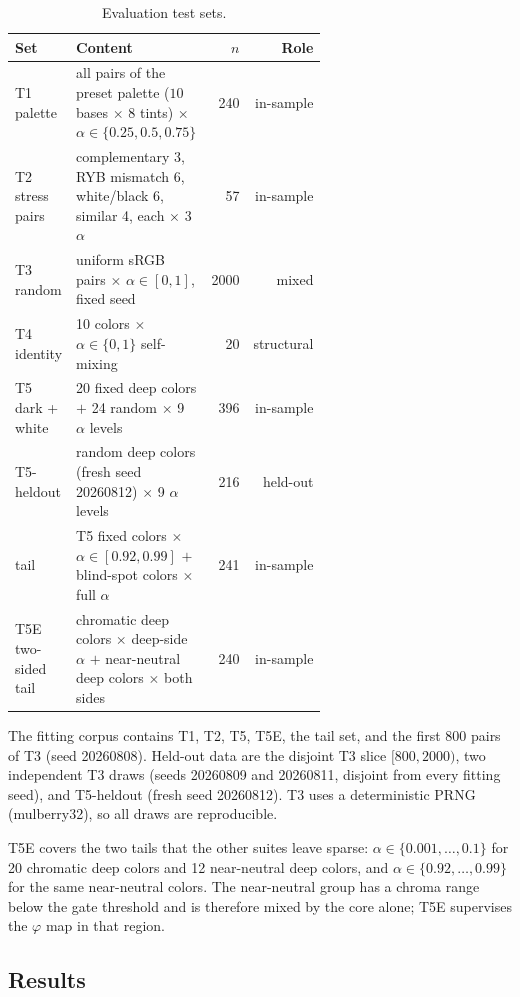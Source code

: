 \begin{table}[t]
\centering
\footnotesize
\setlength{\tabcolsep}{3pt}
\caption{Evaluation test sets.}
\label{tab:sets}
\begin{tabular}{p{0.16\linewidth}p{0.46\linewidth}rr}
\toprule
Set & Content & $n$ & Role \\
\midrule
T1 palette & all pairs of the preset palette ($10$ bases $\times$ $8$ tints) $\times$ $\alpha\in\{0.25,0.5,0.75\}$ & 240 & in-sample \\
T2 stress pairs & complementary 3, RYB mismatch 6, white/black 6, similar 4, each $\times$ 3 $\alpha$ & 57 & in-sample \\
T3 random & uniform sRGB pairs $\times$ $\alpha\in[0,1]$, fixed seed & 2000 & mixed \\
T4 identity & 10 colors $\times$ $\alpha\in\{0,1\}$ self-mixing & 20 & structural \\
T5 dark + white & 20 fixed deep colors $+$ 24 random $\times$ 9 $\alpha$ levels & 396 & in-sample \\
T5-heldout & random deep colors (fresh seed 20260812) $\times$ 9 $\alpha$ levels & 216 & held-out \\
tail & T5 fixed colors $\times$ $\alpha\in[0.92,0.99]$ $+$ blind-spot colors $\times$ full $\alpha$ & 241 & in-sample \\
T5E two-sided tail & chromatic deep colors $\times$ deep-side $\alpha$ $+$ near-neutral deep colors $\times$ both sides & 240 & in-sample \\
\bottomrule
\end{tabular}
\end{table}

The fitting corpus contains T1, T2, T5, T5E, the tail set, and the first 800 pairs of T3 (seed 20260808). Held-out data are the disjoint T3 slice $[800,2000)$, two independent T3 draws (seeds 20260809 and 20260811, disjoint from every fitting seed), and T5-heldout (fresh seed 20260812). T3 uses a deterministic PRNG (mulberry32), so all draws are reproducible.

T5E covers the two tails that the other suites leave sparse: $\alpha\in\{0.001,\dots,0.1\}$ for 20 chromatic deep colors and 12 near-neutral deep colors, and $\alpha\in\{0.92,\dots,0.99\}$ for the same near-neutral colors. The near-neutral group has a chroma range below the gate threshold and is therefore mixed by the core alone; T5E supervises the $\varphi$ map in that region.

\subsection{Results}
\label{sec:results}

